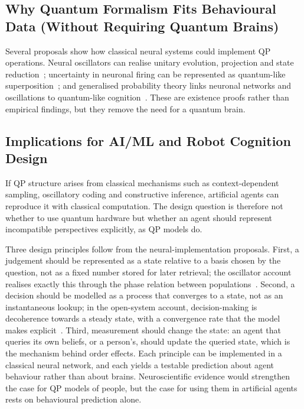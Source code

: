 \documentclass[pdflatex,sn-basic]{sn-jnl}
\begin{document}
\subsection{Why Quantum Formalism Fits Behavioural Data (Without Requiring Quantum Brains)}
Several proposals show how classical neural systems could implement QP operations. Neural oscillators can realise unitary evolution, projection and state reduction~\citep{Busemeyer2017a}; uncertainty in neuronal firing can be represented as quantum-like superposition~\citep{Khrennikov2018}; and generalised probability theory links neuronal networks and oscillations to quantum-like cognition~\citep{Khrennikov2025a,Khrennikov2025b,Khrennikov2025c}. These are existence proofs rather than empirical findings, but they remove the need for a quantum brain.

\subsection{Implications for AI/ML and Robot Cognition Design}
If QP structure arises from classical mechanisms such as context-dependent sampling, oscillatory coding and constructive inference, artificial agents can reproduce it with classical computation. The design question is therefore not whether to use quantum hardware but whether an agent should represent incompatible perspectives explicitly, as QP models do.

Three design principles follow from the neural-implementation proposals. First, a judgement should be represented as a state relative to a basis chosen by the question, not as a fixed number stored for later retrieval; the oscillator account realises exactly this through the phase relation between populations~\citep{Busemeyer2017a}. Second, a decision should be modelled as a process that converges to a state, not as an instantaneous lookup; in the open-system account, decision-making is decoherence towards a steady state, with a convergence rate that the model makes explicit~\citep{Khrennikov2018}. Third, measurement should change the state: an agent that queries its own beliefs, or a person's, should update the queried state, which is the mechanism behind order effects. Each principle can be implemented in a classical neural network, and each yields a testable prediction about agent behaviour rather than about brains. Neuroscientific evidence would strengthen the case for QP models of people, but the case for using them in artificial agents rests on behavioural prediction alone.
\end{document}
